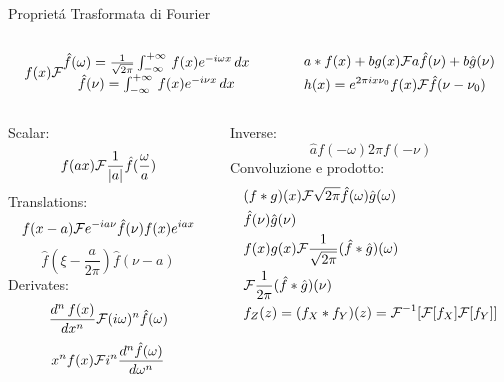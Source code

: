 \documentclass[asd-beamer.tex]{subfiles}%
\begin{document}
\begin{wordonframe}{Propriet\'a Trasformata di Fourier}
\begin{columns}
\begin{column}{0.5\textwidth}
\begin{align*}
f(x)\mathcal{F}{}\begin{matrix}
\hat{f}(\omega)=\frac{1}{\sqrt{2\pi}}\int_{-\infty}^{+\infty}\,f(x)e^{-i\omega x}\,dx\\
\hat{f}(\nu)=\int_{-\infty}^{+\infty}\,f(x)e^{-i\nu x}\,dx\\
\end{matrix}
\end{align*}
\end{column}
\begin{column}{0.5\textwidth}
\begin{align*}
&a*f(x)+bg(x)\mathcal{F}{}a\hat{f}(\nu)+b\hat{g}(\nu)\\
&h(x)=e^{2\pi ix\nu_0}f(x)\mathcal{F}{}\hat{f}(\nu-\nu_0)
\end{align*}
\end{column}
\end{columns}
\begin{columns}
\begin{column}{0.5\textwidth}
Scalar: \[f(ax)\mathcal{F}{}\frac{1}{|a|}\hat{f}(\frac{\omega}{a}) \]
Translations:
\[f(x-a)\mathcal{F}{}e^{-ia\nu}\hat{f}(\nu)f(x)e^{iax}\]
\[\hat{f}(\xi-\frac{a}{2\pi}) \hat{f}(\nu-a)\]
Derivates:
\[\frac{d^n\,f(x)}{dx^n}\mathcal{F}{}(i\omega)^n\hat{f}(\omega)\]
\[x^nf(x)\mathcal{F}{}i^n\frac{d^n\hat{f}(\omega)}{d\omega^n}\]
\end{column}
\begin{column}{0.5\textwidth}
Inverse: \[\hat{a} f(-\omega) 2\pi f(-\nu)\]
Convoluzione e prodotto:
\begin{align*}
&(f*g)(x)\mathcal{F}{}\sqrt{2\pi}\hat{f}(\omega)\hat{g}(\omega)\\
&\hat{f}(\nu)\hat{g}(\nu)\\
&f(x)g(x)\mathcal{F}{}\frac{1}{\sqrt{2\pi}}(\hat{f}*\hat{g})(\omega)\\
&\mathcal{F}{}\frac{1}{2\pi}(\hat{f}*\hat{g})(\nu)\\
&f_Z(z)=(f_X*f_Y)(z)={\mathcal{F}{}}^{-1}{[\mathcal{F}{[f_X]}\mathcal{F}{[f_Y]}]}
\end{align*}

\end{column}
\end{columns}
\end{wordonframe}
\end{document}
